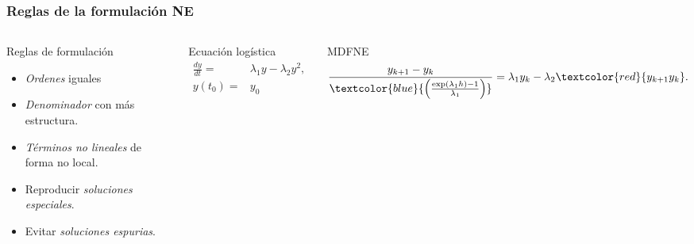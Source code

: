 %
\begin{frame}%
    \frametitle{Reglas de la formulaci\'on NE}
    \begin{columns}
      \begin{beamerboxesrounded}
      [upper=color titulo caja, lower=color cuerpo caja, shadow=true]
      {Reglas de formulaci\'on}
        \begin{itemize}[<+->]
            \item
              \emph{Ordenes} iguales
            \item
              \emph{Denominador} con m\'as estructura.
            \item
              \emph{T\'erminos no lineales} de forma no local.
            \item
              Reproducir \emph{soluciones especiales}.
            \item
              Evitar \emph{soluciones espurias}.
          \end{itemize}
      \end{beamerboxesrounded}
     \begin{exampleblock}{Ecuaci\'on log\'istica}
      \begin{align*}
        \frac{dy}{dt}=&\lambda_1 y-\lambda_2 y^2, \\
         y(t_0)=&y_0
      \end{align*}
     \end{exampleblock}
     \begin{exampleblock}{MDFNE}
      $$%
          \frac{y_{k+1}-y_k}{
                  \textcolor{blue}{\left(
                  \frac{\exp(\lambda_1 h)-1}{\lambda_1}
                \right)}
              }=
              \lambda_1 y_k-\lambda_2 \textcolor{red}{ y_{k+1}y_{k}} .
        $$%
      \end{exampleblock}
    \end{columns}
\end{frame}
